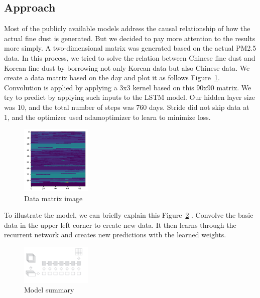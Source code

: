 \documentclass{kcc}
\begin{document}
\subsection{Approach}

Most of the publicly available models address the causal relationship of how the actual fine dust is generated. But we decided to pay more attention to the results more simply. A two-dimensional matrix was generated based on the actual PM2.5 data. In this process, we tried to solve the relation between Chinese fine dust and Korean fine dust by borrowing not only Korean data but also Chinese data. We create a data matrix based on the day and plot it as follows Figure~\ref{fig:data}. Convolution is applied by applying a 3x3 kernel based on this 90x90 matrix. We try to predict by applying such inputs to the LSTM model.
Our hidden layer size was 10, and the total number of steps was 760 days. Stride did not skip data at 1, and the optimizer used adamoptimizer to learn to minimize loss.
\begin{figure}[h]
  \begin{center}
     \includegraphics[width=0.3\textwidth]{fig/data.png}
  \end{center}
  \caption{Data matrix image}
  \label{fig:data}
\end{figure}

To illustrate the model, we can briefly explain this Figure~\ref{fig:model} . Convolve the basic data in the upper left corner to create new data. It then learns through the recurrent network and creates new predictions with the learned weights. 

\begin{figure}[h]
  \begin{center}
     \includegraphics[width=0.3\textwidth]{fig/model.png}
  \end{center}
  \caption{Model summary}
  \label{fig:model}
\end{figure}
\end{document}

